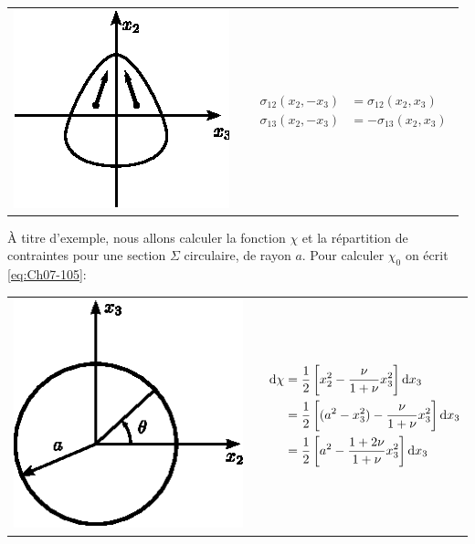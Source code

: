 \begin{tabular}{m{2cm}p{1cm}m{8cm}}
        \includegraphics{../images/T1_Ch07-20}&&
$\begin{aligned}
            \sigma_{12} (x_2, -x_3) &= \sigma_{12} (x_2, x_3) \\[3pt]
            \sigma_{13} (x_2, -x_3) &= -\sigma_{13} (x_2, x_3)
        \end{aligned}$
\end{tabular}

\`A titre d'exemple, nous allons calculer la fonction $\chi$ et la répartition de contraintes pour une section $\Sigma$ circulaire, de rayon $a$.
Pour calculer $\chi_0$ on écrit \eqref{eq:Ch07-105}:


\begin{tabular}{m{2cm}p{1cm}m{8cm}}
        \includegraphics{../images/T1_Ch07-21}&&
$\begin{aligned}
        \mathop{\mathrm{{}d}}\mathopen{}\chi &= \frac{1}{2} \left[ x_2^2 - \frac{\nu}{1+\nu} x_3^2 \right] \mathop{\mathrm{{}d}}\mathopen{} x_3 \\
        &= \frac{1}{2} \left[ (a^2 - x_3^2) - \frac{\nu}{1+\nu} x_3^2 \right] \mathop{\mathrm{{}d}}\mathopen{} x_3 \\
        &= \frac{1}{2} \left[ a^2 - \frac{1+2\nu}{1+\nu} x_3^2 \right] \mathop{\mathrm{{}d}}\mathopen{} x_3
    \end{aligned}$
\end{tabular}

